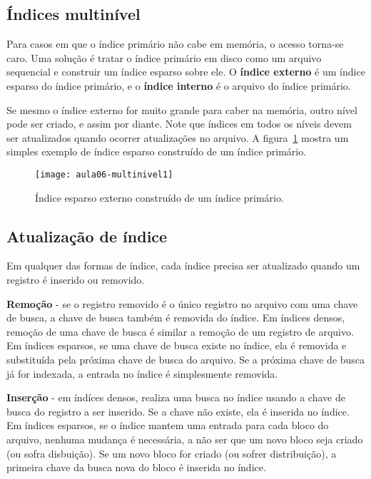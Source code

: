 \subsection{Índices multinível}

Para casos em que o índice primário não cabe em memória, o acesso torna-se caro.
Uma solução é tratar o índice primário em disco como um arquivo sequencial e
construir um índice esparso sobre ele.
O \textbf{índice externo} é um índice esparso do índice primário, e 
o \textbf{índice interno} é o arquivo do índice primário.

Se mesmo o índice externo for muito grande para caber na memória, outro nível
pode ser criado, e assim por diante.
Note que índices em todos os níveis devem ser atualizados quando ocorrer
atualizações no arquivo.
A figura~\ref{aula06:fig:multinivel} mostra um simples exemplo de índice esparso
construído de um índice primário.
%
\begin{figure}[!htb]
\centering
\texttt{[image: aula06-multinivel1]}
\caption{Índice esparso externo construído de um índice primário.}
\label{aula06:fig:multinivel}
\end{figure}

\subsection{Atualização de índice}

Em qualquer das formas de índice, cada índice precisa ser atualizado quando um
registro é inserido ou removido.

{\bf Remoção} - se o registro removido é o único registro no arquivo
com uma chave de busca, a chave de busca também é removida do índice.
Em índices densos, remoção de uma chave de busca é similar a remoção
de um registro de arquivo.
Em índices esparsos, se uma chave de busca existe no índice, ela é removida 
e substituída pela próxima chave de busca do arquivo.
Se a próxima chave de busca já for indexada, a entrada no índice é simplesmente 
removida.

{\bf Inserção} - em índíces densos, realiza uma busca no índice usando a chave de
busca do registro a ser inserido.
Se a chave não existe, ela é inserida no índice.
Em índices esparsos, se o índice mantem uma entrada para cada bloco do arquivo,
nenhuma mudança é necessária, a não ser que um novo bloco seja criado (ou sofra
disbuição).
Se um novo bloco for criado (ou sofrer distribuição), 
a primeira chave da busca nova do bloco é inserida no índice.

